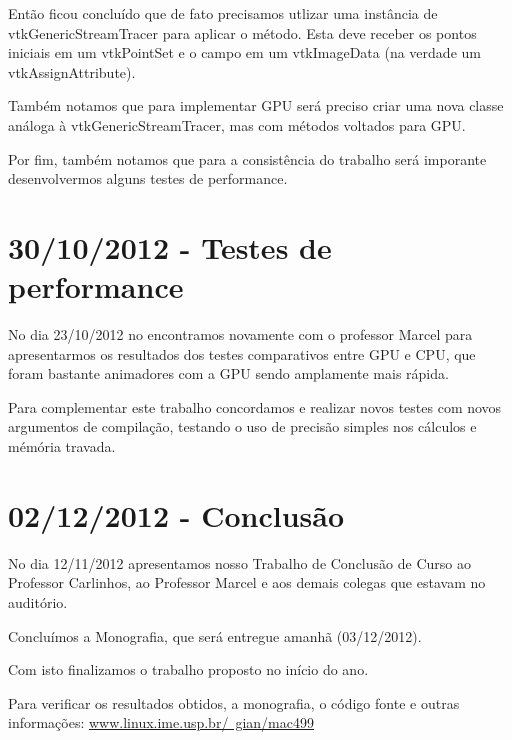 \documentclass[a4paper,11pt]{report}
\begin{document}
Então ficou concluído que de fato precisamos utlizar uma instância de vtkGenericStreamTracer para aplicar o método. Esta deve receber os pontos iniciais em um vtkPointSet e o campo em um vtkImageData (na verdade um vtkAssignAttribute).

Também notamos que para implementar GPU será preciso criar uma nova classe análoga à vtkGenericStreamTracer, mas com métodos voltados para GPU.

Por fim, também notamos que para a consistência do trabalho será imporante desenvolvermos alguns testes de performance.

\section{30/10/2012 - Testes de performance}
No dia 23/10/2012 no encontramos novamente com o professor Marcel para apresentarmos os resultados dos testes comparativos entre GPU e CPU, que foram bastante animadores com a GPU sendo amplamente mais rápida.

Para complementar este trabalho concordamos e realizar novos testes com novos argumentos de compilação, testando o uso de precisão simples nos cálculos e mémória travada.

\section{02/12/2012 - Conclusão}
No dia 12/11/2012 apresentamos nosso Trabalho de Conclusão de Curso ao Professor Carlinhos, ao Professor Marcel e aos demais colegas que estavam no auditório.

Concluímos a Monografia, que será entregue amanhã (03/12/2012).

Com isto finalizamos o trabalho proposto no início do ano.

Para verificar os resultados obtidos, a monografia, o código fonte e outras informações: \href{www.linux.ime.usp.br/~gian/mac499}{www.linux.ime.usp.br/~gian/mac499}
\end{document}
